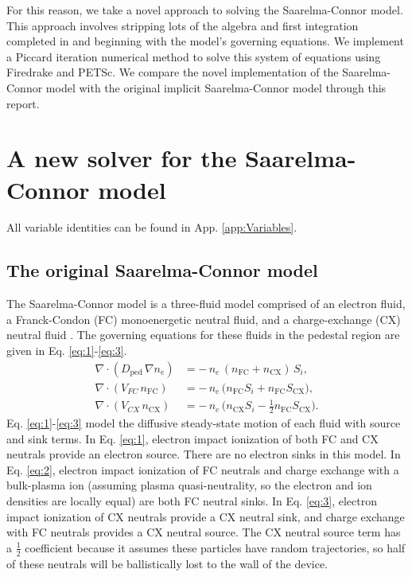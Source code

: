 \documentclass[twocolumn,secnumarabic,amssymb, nobibnotes, aps, prd]{revtex4-2}
\renewcommand{\ne}{n_{e}}  %
\newcommand{\nfc}{n_{\mathrm{FC}}}
\newcommand{\ncx}{n_{\mathrm{CX}}}
\newcommand{\Si}{S_{i}}
\newcommand{\Scx}{S_{\mathrm{CX}}}
\newcommand{\Dped}{D_{\mathrm{ped}}}
\begin{document}
For this reason, we take a novel approach to solving the Saarelma-Connor model.
This approach involves stripping lots of the algebra and first integration completed in \cite{saarelma2023testing} and beginning with the model's governing equations.
We implement a Piccard iteration numerical method to solve this system of equations using Firedrake and PETSc.
We compare the novel implementation of the Saarelma-Connor model with the original implicit Saarelma-Connor model through this report.


\section{A new solver for the Saarelma-Connor model}
All variable identities can be found in App. \ref{app:Variables}.

\label{sect:methods}
\subsection{The original Saarelma-Connor model}
The Saarelma-Connor model is a three-fluid model comprised of an electron fluid, a Franck-Condon (FC) monoenergetic neutral fluid, and a charge-exchange (CX) neutral fluid \cite{saarelma2023testing}.
The governing equations for these fluids in the pedestal region are given in Eq. \ref{eq:1}-\ref{eq:3}.
\begin{align}
  \nabla\cdot(\Dped\,\nabla\ne)
    &= -\,\ne\,(\nfc + \ncx)\,\Si, \label{eq:1} \\
  \nabla\cdot(V_{FC}\,\nfc)
    &= -\,\ne\,\bigl(\nfc\Si + \nfc\Scx\bigr), \label{eq:2} \\
  \nabla\cdot(V_{CX}\,\ncx)
    &= -\,\ne\,\bigl(\ncx\Si - \tfrac{1}{2}\nfc\Scx\bigr).
    \label{eq:3}
\end{align}
Eq. \ref{eq:1}-\ref{eq:3} model the diffusive steady-state motion of each fluid with source and sink terms. 
In Eq. \ref{eq:1}, electron impact ionization of both FC and CX neutrals provide an electron source.
There are no electron sinks in this model.
In Eq. \ref{eq:2}, electron impact ionization of FC neutrals and charge exchange with a bulk-plasma ion (assuming plasma quasi-neutrality, so the electron and ion densities are locally equal) are both FC neutral sinks.
In Eq. \ref{eq:3}, electron impact ionization of CX neutrals provide a CX neutral sink, and charge exchange with FC neutrals provides a CX neutral source. 
The CX neutral source term has a $\frac{1}{2}$ coefficient because it assumes these particles have random trajectories, so half of these neutrals will be ballistically lost to the wall of the device.
\end{document}
